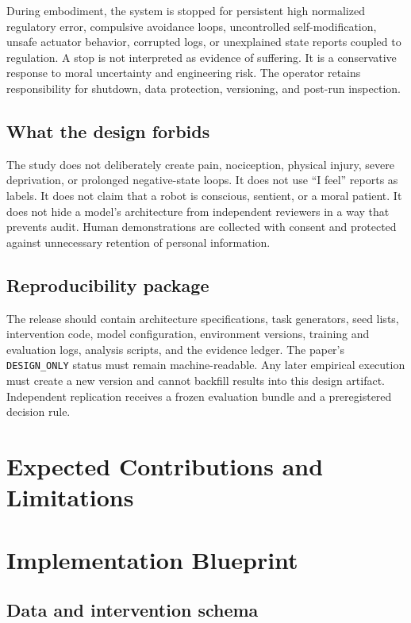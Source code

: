 \documentclass[conference]{IEEEtran}
\begin{document}
During embodiment, the system is stopped for persistent high normalized regulatory error, compulsive avoidance loops, uncontrolled self-modification, unsafe actuator behavior, corrupted logs, or unexplained state reports coupled to regulation. A stop is not interpreted as evidence of suffering. It is a conservative response to moral uncertainty and engineering risk. The operator retains responsibility for shutdown, data protection, versioning, and post-run inspection.

\subsection{What the design forbids}

The study does not deliberately create pain, nociception, physical injury, severe deprivation, or prolonged negative-state loops. It does not use “I feel” reports as labels. It does not claim that a robot is conscious, sentient, or a moral patient. It does not hide a model's architecture from independent reviewers in a way that prevents audit. Human demonstrations are collected with consent and protected against unnecessary retention of personal information.

\subsection{Reproducibility package}

The release should contain architecture specifications, task generators, seed lists, intervention code, model configuration, environment versions, training and evaluation logs, analysis scripts, and the evidence ledger. The paper's \texttt{DESIGN\_ONLY} status must remain machine-readable. Any later empirical execution must create a new version and cannot backfill results into this design artifact. Independent replication receives a frozen evaluation bundle and a preregistered decision rule.

\section{Expected Contributions and Limitations}

\section{Implementation Blueprint}

\subsection{Data and intervention schema}
\end{document}
